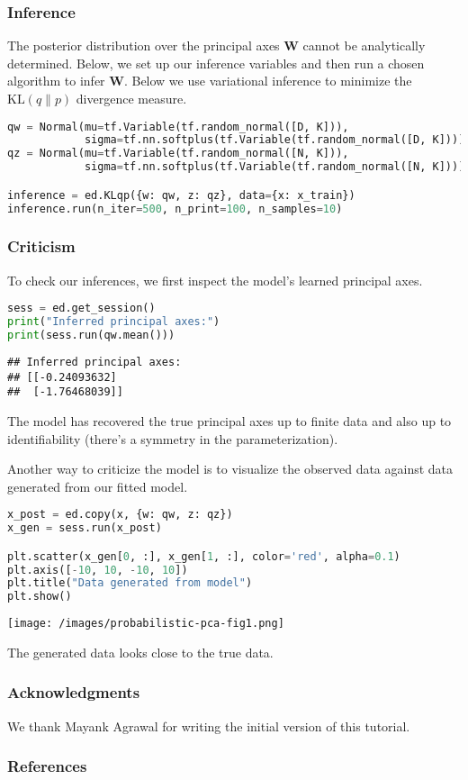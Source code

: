 \subsubsection{Inference}

The posterior distribution over the principal axes $\mathbf{W}$ cannot
be analytically determined. Below, we set up our inference variables
and then run a chosen algorithm to infer $\mathbf{W}$. Below we use
variational inference to minimize the $\text{KL}(q\|p)$ divergence
measure.

\begin{lstlisting}[language=Python]
qw = Normal(mu=tf.Variable(tf.random_normal([D, K])),
            sigma=tf.nn.softplus(tf.Variable(tf.random_normal([D, K]))))
qz = Normal(mu=tf.Variable(tf.random_normal([N, K])),
            sigma=tf.nn.softplus(tf.Variable(tf.random_normal([N, K]))))

inference = ed.KLqp({w: qw, z: qz}, data={x: x_train})
inference.run(n_iter=500, n_print=100, n_samples=10)
\end{lstlisting}

\subsubsection{Criticism}

To check our inferences, we first inspect the model's learned
principal axes.

\begin{lstlisting}[language=Python]
sess = ed.get_session()
print("Inferred principal axes:")
print(sess.run(qw.mean()))
\end{lstlisting}

\begin{lstlisting}
## Inferred principal axes:
## [[-0.24093632]
##  [-1.76468039]]
\end{lstlisting}

The model has recovered the true principal axes up to finite data and
also up to identifiability (there's a symmetry in the
parameterization).

Another way to criticize the model is to visualize the observed data
against data generated from our fitted model.

\begin{lstlisting}[language=Python]
x_post = ed.copy(x, {w: qw, z: qz})
x_gen = sess.run(x_post)

plt.scatter(x_gen[0, :], x_gen[1, :], color='red', alpha=0.1)
plt.axis([-10, 10, -10, 10])
plt.title("Data generated from model")
plt.show()
\end{lstlisting}

\texttt{[image: /images/probabilistic-pca-fig1.png]}

The generated data looks close to the true data.

\subsubsection{Acknowledgments}

We thank Mayank Agrawal for writing the initial version of this
tutorial.

\subsubsection{References}\label{references}
